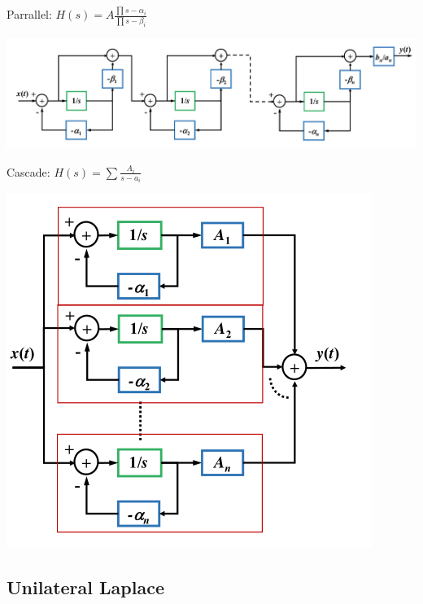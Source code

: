 Parrallel: $H(s)=A\frac{\prod s-\alpha_i}{\prod s - \beta_i}$ 

\includegraphics[scale=0.25]{inhalt/Parallel.png}

Cascade: $H(s) = \sum \frac{A_i}{s-a_i}$

\includegraphics[scale=0.35]{inhalt/cascade.png}

\subsection*{Unilateral Laplace}